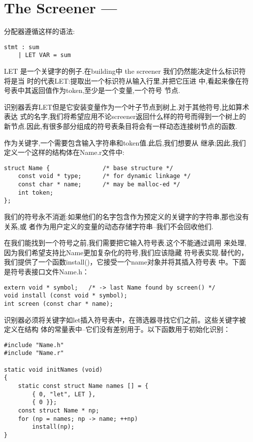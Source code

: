 \section{The Screener ---}
分配器遵循这样的语法:
\begin{lstlisting}
stmt : sum
    | LET VAR = sum
\end{lstlisting}
LET 是一个关键字的例子.在building中 the screener 我们仍然能决定什么标识符将是当
时的代表LET:提取出一个标识符从输入行里,并把它压进
中,看起来像在符号表中其返回值作为token,至少是一个变量,一个符号
节点.

    识别器丢弃LET但是它安装变量作为一个叶子节点到树上.对于其他符号,比如算术表达
式的名字,我们将希望应用不论screener返回什么样的符号而得到一个树上的
新节点.因此,有很多部分组成的符号表条目将会有一样动态连接树节点的函数.

    作为关键字,一个需要包含输入字符串和token值.此后,我们想要从
继承;因此,我们定义一个这样的结构体在Name.r文件中:
\begin{lstlisting}
struct Name {               /* base structure */
    const void * type;      /* for dynamic linkage */
    const char * name;      /* may be malloc-ed */
    int token;
};
\end{lstlisting}
我们的符号永不消逝:如果他们的名字包含作为预定义的关键字的字符串,那也没有关系,或
者作为用户定义的变量的动态存储字符串--我们不会回收他们.

    在我们能找到一个符号之前,我们需要把它输入符号表.这个不能通过调用
来处理,因为我们希望支持比Name更加复杂化的符号,我们应该隐藏
符号表实现.替代的，我们提供了一个函数install()，它接受一个name对象并将其插入符号表
中。下面是符号表接口文件Name.h：
\begin{lstlisting}
extern void * symbol;   /* -> last Name found by screen() */
void install (const void * symbol);
int screen (const char * name);
\end{lstlisting}

    识别器必须将关键字如let插入符号表中，在筛选器寻找它们之前。这些关键字被定义在结构
体的常量表中--它们没有差别用于。以下函数用于初始化识别：
\begin{lstlisting}
#include "Name.h"
#include "Name.r"

static void initNames (void)
{
    static const struct Name names [] = {
        { 0, "let", LET },
        { 0 }};
    const struct Name * np;
    for (np = names; np -> name; ++np)
        install(np);
}
\end{lstlisting}

